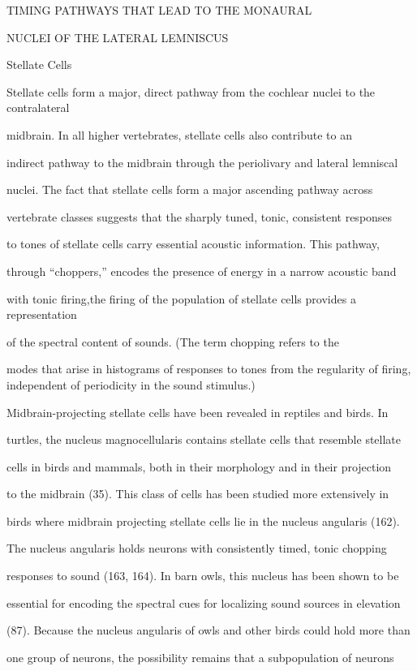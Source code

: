 \documentclass[10pt,a4paper]{article}
\begin{document}
TIMING PATHWAYS THAT LEAD TO THE MONAURAL

NUCLEI OF THE LATERAL LEMNISCUS

Stellate Cells

Stellate cells form a major, direct pathway from the cochlear nuclei to the
contralateral

midbrain. In all higher vertebrates, stellate cells also contribute to an

indirect pathway to the midbrain through the periolivary and lateral lemniscal

nuclei. The fact that stellate cells form a major ascending pathway across

vertebrate classes suggests that the sharply tuned, tonic, consistent responses

to tones of stellate cells carry essential acoustic information. This pathway,

through {\textquotedblleft}choppers,{\textquotedblright} encodes the presence of
energy in a narrow acoustic band

with tonic firing,the firing of the population of stellate cells provides a
representation

of the spectral content of sounds. (The term chopping refers to the

modes that arise in histograms of responses to tones from the regularity of
firing, independent of periodicity in the sound stimulus.)

Midbrain-projecting stellate cells have been revealed in reptiles and birds. In

turtles, the nucleus magnocellularis contains stellate cells that resemble
stellate

cells in birds and mammals, both in their morphology and in their projection

to the midbrain (35). This class of cells has been studied more extensively in

birds where midbrain projecting stellate cells lie in the nucleus angularis
(162).

The nucleus angularis holds neurons with consistently timed, tonic chopping

responses to sound (163, 164). In barn owls, this nucleus has been shown to be

essential for encoding the spectral cues for localizing sound sources in
elevation

(87). Because the nucleus angularis of owls and other birds could hold more than

one group of neurons, the possibility remains that a subpopulation of neurons
\end{document}
